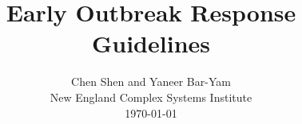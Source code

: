 \documentclass[onecolumn,journal]{IEEEtran}
\begin{document}
\title{\color{Brown} Early Outbreak Response Guidelines\\
\vspace{-0.35ex}}
\author{Chen Shen and Yaneer Bar-Yam \\ New England Complex Systems Institute \\
 \today 
  \vspace{-14ex} \\ 

   
\bigskip
\bigskip

\textbf{}
 }
    
\maketitle


\flushbottom %



\thispagestyle{empty} %




\renewcommand{\thefootnote}{\fnsymbol{footnote}}
\end{document}
